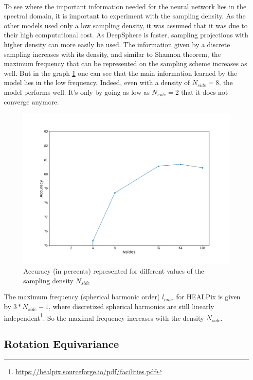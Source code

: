 \documentclass[11pt]{report}
\begin{document}
\paragraph*{}
To see where the important information needed for the neural network lies in the spectral domain, it is important to experiment with the sampling density. As the other models used only a low sampling density, it was assumed that it was due to their high computational cost. As DeepSphere is faster, sampling projections with higher density can more easily be used. The information given by a discrete sampling increases with its density, and similar to Shannon theorem, the maximum frequency that can be represented on the sampling scheme increases as well. But in the graph \ref{fig:samp_density_influece} one can see that the main information learned by the model lies in the low frequency. Indeed, even with a density of $N_{side}=8$, the model performs well. It's only by going as low as $N_{side}=2$ that it does not converge anymore.
\begin{figure}[!ht]
    \centering
    \includegraphics[width=0.7\linewidth]{density_plot.png}
    \caption{Accuracy (in percents) represented for different values of the sampling density $N_{side}$}
    \label{fig:samp_density_influece}
\end{figure}
The maximum frequency (spherical harmonic order) $l_{max}$ for HEALPix is given by $3*N_{side}-1$, where discretized spherical harmonics are still linearly independent\footnote{\url{https://healpix.sourceforge.io/pdf/facilities.pdf}}. So the maximal frequency increases with the density $N_{side}$.

\subsection{Rotation Equivariance}\label{sec:shrec17_equivariance}
\end{document}

